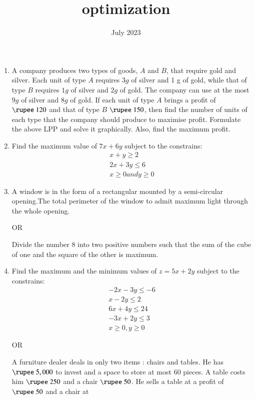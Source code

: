 \documentclass{article}
\begin{document}
\begin{center}
\title{optimization}
\date{July 2023}
\maketitle     
\end{center}
\begin{enumerate}
  
\item A company produces two types of goods, $A$ and $B$, that require gold and
silver. Each unit of type $A$ requires $3g$ of silver and 1 g of gold, while that
of type $B$ requires $1g$ of silver and $2g$ of gold. The company can use at
the most $9g$ of silver and $8g$ of gold. If each unit of type $A$ brings a profit
of $\rupee~120$ and that of type $B$ $\rupee~150$, then find the number of units of each
type that the company should produce to maximise profit.
Formulate the above LPP and solve it graphically. Also, find the
maximum profit.
\item Find the maximum value of $7x+6y$ subject to the constrains:
\begin{align}
    x+y \geq   2\\
    2x+3y\leq 6\\
    x \geq 0 and y\geq 0
\end{align}
\item A window is in the form of a rectangular mounted by a semi-circular opening.The total perimeter of the window to admit maximum light through the whole opening.
\begin{center}
    OR
\end{center}
Divide the number $8$ into two positive numbers such that the sum of the cube of one and the square of the other is maximum.
\item Find the maximum and the minimum values of $z=5x+2y$ subject to the constrains:
\begin{align}
-2x-3y\leq-6\\
x-2y\leq2\\
6x+4y\leq24\\
-3x+2y\leq3\\
x\geq0,y\geq0
\end{align}
 \begin{center}
     OR
 \end{center}  
 A furniture dealer deals in only two items : chairs and tables. He has
$\rupee~5,000$  to invest and a space to store at most $60$ pieces. A table costs him
$\rupee~250$ and a chair $\rupee~50$. He sells a table at a profit of $\rupee~50$ and a chair at

\end{enumerate}
\end{document}
